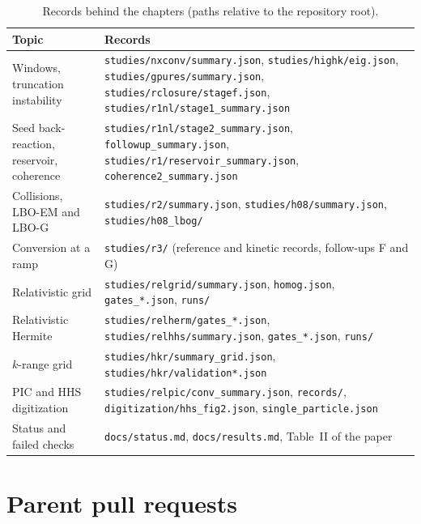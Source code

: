 \begin{table}[t]
\centering
\caption{Records behind the chapters (paths relative to the repository root).}\label{tab:a-index}
\small
\begin{tabular}{@{}p{3.6cm}p{9.6cm}@{}}\toprule
Topic & Records\\\midrule
Windows, truncation instability & \texttt{studies/nxconv/summary.json}, \texttt{studies/highk/eig.json}, \texttt{studies/gpures/summary.json}, \texttt{studies/rclosure/stagef.json}, \texttt{studies/r1nl/stage1\_summary.json}\\
Seed back-reaction, reservoir, coherence & \texttt{studies/r1nl/stage2\_summary.json}, \texttt{followup\_summary.json}, \texttt{studies/r1/reservoir\_summary.json}, \texttt{coherence2\_summary.json}\\
Collisions, LBO-EM and LBO-G & \texttt{studies/r2/summary.json}, \texttt{studies/h08/summary.json}, \texttt{studies/h08\_lbog/}\\
Conversion at a ramp & \texttt{studies/r3/} (reference and kinetic records, follow-ups F and G)\\
Relativistic grid & \texttt{studies/relgrid/summary.json}, \texttt{homog.json}, \texttt{gates\_*.json}, \texttt{runs/}\\
Relativistic Hermite & \texttt{studies/relherm/gates\_*.json}, \texttt{studies/relhhs/summary.json}, \texttt{gates\_*.json}, \texttt{runs/}\\
$k$-range grid & \texttt{studies/hkr/summary\_grid.json}, \texttt{studies/hkr/validation*.json}\\
PIC and HHS digitization & \texttt{studies/relpic/conv\_summary.json}, \texttt{records/}, \texttt{digitization/hhs\_fig2.json}, \texttt{single\_particle.json}\\
Status and failed checks & \texttt{docs/status.md}, \texttt{docs/results.md}, Table~II of the paper\\\bottomrule
\end{tabular}
\end{table}

\section{Parent pull requests}


